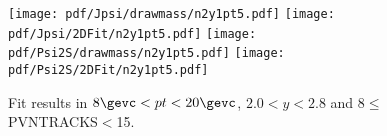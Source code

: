 \begin{figure}[H]
\begin{center}
\texttt{[image: pdf/Jpsi/drawmass/n2y1pt5.pdf]}
\texttt{[image: pdf/Jpsi/2DFit/n2y1pt5.pdf]}
\vspace*{-0.5cm}
\texttt{[image: pdf/Psi2S/drawmass/n2y1pt5.pdf]}
\texttt{[image: pdf/Psi2S/2DFit/n2y1pt5.pdf]}
\vspace*{-0.5cm}
\end{center}
\caption{Fit results in $8\gevc<pt<20\gevc$, $2.0<y<2.8$ and 8$\leq$PVNTRACKS$<$15.}
\label{Fitn2y1pt5}
\end{figure}
